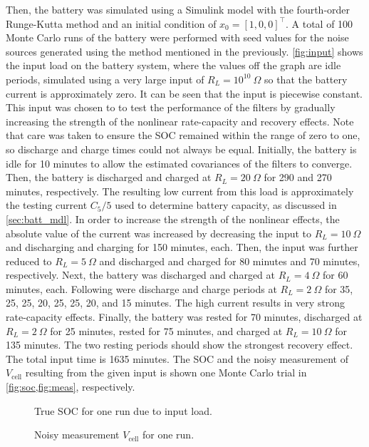 \documentclass[../zhang_thesis.tex]{subfiles}
\begin{document}
Then, the battery was simulated using a Simulink model with the fourth-order Runge-Kutta method and an initial condition of $x_0=[1,0,0]^\top$. A total of 100 Monte Carlo runs of the battery were performed with seed values for the noise sources generated using the method mentioned in the previously. \cref{fig:input} shows the input load on the battery system, where the values off the graph are idle periods, simulated using a very large input of $R_L=10^{10}~\Omega$ so that the battery
current is approximately zero. It can be seen that the input is piecewise constant. This input was chosen to to test the performance of the filters by gradually increasing the strength of the nonlinear rate-capacity and recovery effects. Note that care was taken to ensure the SOC remained within the range of zero to one, so discharge and charge times could not always be equal. Initially, the battery is idle for 10 minutes to allow the estimated covariances of the filters to converge. Then, the
battery is discharged and charged at $R_L=20~\Omega$ for 290 and 270 minutes, respectively. The resulting low current from this load is approximately the testing current $C_5/5$ used to determine battery capacity, as discussed in \cref{sec:batt_mdl}. In order to increase the strength of the nonlinear effects, the absolute value of the current was increased by decreasing the input to $R_L=10~\Omega$ and discharging and charging for 150 minutes, each. Then, the input was further reduced to
$R_L=5~\Omega$ and discharged and charged for 80 minutes and 70 minutes, respectively. Next, the battery was discharged and charged at $R_L=4~\Omega$ for 60 minutes, each. Following were discharge and charge periods at $R_L=2~\Omega$ for 35, 25, 25, 20, 25, 25, 20, and 15 minutes. The high current results in very strong rate-capacity effects. Finally, the battery was rested for 70 minutes, discharged at $R_L=2~\Omega$ for 25 minutes, rested for 75 minutes, and charged at $R_L=10~\Omega$
for 135 minutes. The two resting periods should show the strongest recovery effect. The total input time is 1635 minutes. The SOC and the noisy measurement of $V_\text{cell}$ resulting from the given input is shown one Monte Carlo trial in \cref{fig:soc,fig:meas}, respectively.

\begin{figure}[htb]
\centering

\caption{True SOC for one run due to input load.}
\label{fig:soc}
\end{figure}

\begin{figure}[htb]
\centering

\caption{Noisy measurement $V_\text{cell}$ for one run.}
\label{fig:meas}
\end{figure}
\end{document}
